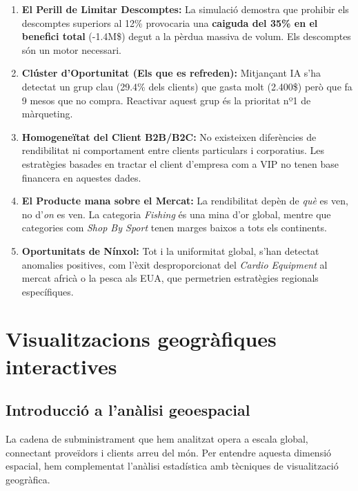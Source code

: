 \documentclass[12pt,a4paper]{article}
\begin{document}
\begin{enumerate}
    \item \textbf{El Perill de Limitar Descomptes:} La simulació demostra que prohibir els descomptes superiors al 12\% provocaria una \textbf{caiguda del 35\% en el benefici total} (-1.4M\$) degut a la pèrdua massiva de volum. Els descomptes són un motor necessari.
    
    \item \textbf{Clúster d'Oportunitat (Els que es refreden):} Mitjançant IA s'ha detectat un grup clau (29.4\% dels clients) que gasta molt (2.400\$) però que fa 9 mesos que no compra. Reactivar aquest grup és la prioritat nº1 de màrqueting.
    
    \item \textbf{Homogeneïtat del Client B2B/B2C:} No existeixen diferències de rendibilitat ni comportament entre clients particulars i corporatius. Les estratègies basades en tractar el client d'empresa com a VIP no tenen base financera en aquestes dades.
    
    \item \textbf{El Producte mana sobre el Mercat:} La rendibilitat depèn de \textit{què} es ven, no d'\textit{on} es ven. La categoria \textit{Fishing} és una mina d'or global, mentre que categories com \textit{Shop By Sport} tenen marges baixos a tots els continents.
    
    \item \textbf{Oportunitats de Nínxol:} Tot i la uniformitat global, s'han detectat anomalies positives, com l'èxit desproporcionat del \textit{Cardio Equipment} al mercat africà o la pesca als EUA, que permetrien estratègies regionals específiques.
\end{enumerate}

\section{Visualitzacions geogràfiques interactives}

\subsection{Introducció a l'anàlisi geoespacial}
La cadena de subministrament que hem analitzat opera a escala global, connectant proveïdors i clients arreu del món. Per entendre aquesta dimensió espacial, hem complementat l'anàlisi estadística amb tècniques de visualització geogràfica.
\end{document}
